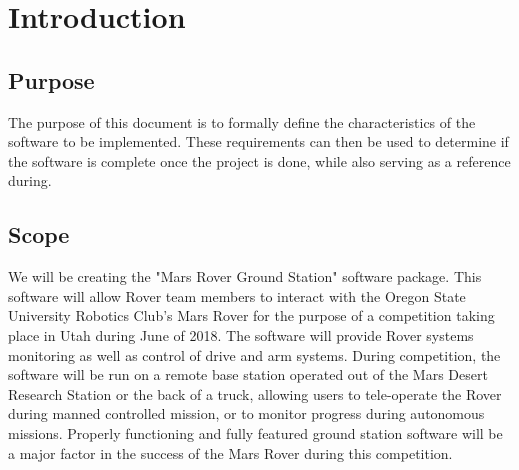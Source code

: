 \documentclass[onecolumn, draftclsnofoot, 10pt, compsoc]{IEEEtran}
\begin{document}
\section{Introduction}
\subsection{Purpose}
The purpose of this document is to formally define the characteristics of the software to be implemented. 
These requirements can then be used to determine if the software is complete once the project is done, while also serving as a reference during.
\subsection{Scope}
We will be creating the "Mars Rover Ground Station" software package. 
This software will allow Rover team members to interact with the Oregon State University Robotics Club's Mars Rover for the purpose of a competition taking place in Utah during June of 2018. 
The software will provide Rover systems monitoring as well as control of drive and arm systems. 
During competition, the software will be run on a remote base station operated out of the Mars Desert Research Station or the back of a truck, allowing users to tele-operate the Rover during manned controlled mission, or to monitor progress during autonomous missions. 
Properly functioning and fully featured ground station software will be a major factor in the success of the Mars Rover during this competition.
\end{document}
